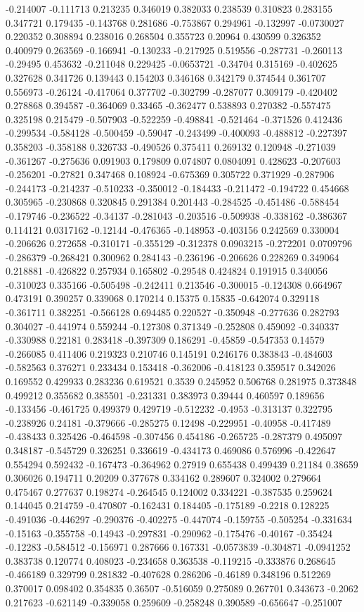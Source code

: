 -0.214007 -0.111713 0.213235 0.346019 0.382033 0.238539 0.310823 0.283155 0.347721 0.179435 -0.143768 0.281686 -0.753867 0.294961 -0.132997 -0.0730027 0.220352 0.308894 0.238016 0.268504 0.355723 0.20964 0.430599 0.326352 0.400979 0.263569 -0.166941 -0.130233 -0.217925 0.519556 -0.287731 -0.260113 -0.29495 0.453632 -0.211048 0.229425 -0.0653721 -0.34704 0.315169 -0.402625 0.327628 0.341726 0.139443 0.154203 0.346168 0.342179 0.374544 0.361707 0.556973 -0.26124 -0.417064 0.377702 -0.302799 -0.287077 0.309179 -0.420402 0.278868 0.394587 -0.364069 0.33465 -0.362477 0.538893 0.270382 -0.557475 0.325198 0.215479 -0.507903 -0.522259 -0.498841 -0.521464 -0.371526 0.412436 -0.299534 -0.584128 -0.500459 -0.59047 -0.243499 -0.400093 -0.488812 -0.227397 0.358203 -0.358188 0.326733 -0.490526 0.375411 0.269132 0.120948 -0.271039 -0.361267 -0.275636 0.091903 0.179809 0.074807 0.0804091 0.428623 -0.207603 -0.256201 -0.27821 0.347468 0.108924 -0.675369 0.305722 0.371929 -0.287906 -0.244173 -0.214237 -0.510233 -0.350012 -0.184433 -0.211472 -0.194722 0.454668 0.305965 -0.230868 0.320845 0.291384 0.201443 -0.284525 -0.451486 -0.588454 -0.179746 -0.236522 -0.34137 -0.281043 -0.203516 -0.509938 -0.338162 -0.386367 0.114121 0.0317162 -0.12144 -0.476365 -0.148953 -0.403156 0.242569 0.330004 -0.206626 0.272658 -0.310171 -0.355129 -0.312378 0.0903215 -0.272201 0.0709796 -0.286379 -0.268421 0.300962 0.284143 -0.236196 -0.206626 0.228269 0.349064 0.218881 -0.426822 0.257934 0.165802 -0.29548 0.424824 0.191915 0.340056 -0.310023 0.335166 -0.505498 -0.242411 0.213546 -0.300015 -0.124308 0.664967 0.473191 0.390257 0.339068 0.170214 0.15375 0.15835 -0.642074 0.329118 -0.361711 0.382251 -0.566128 0.694485 0.220527 -0.350948 -0.277636 0.282793 0.304027 -0.441974 0.559244 -0.127308 0.371349 -0.252808 0.459092 -0.340337 -0.330988 0.22181 0.283418 -0.397309 0.186291 -0.45859 -0.547353 0.14579 -0.266085 0.411406 0.219323 0.210746 0.145191 0.246176 0.383843 -0.484603 -0.582563 0.376271 0.233434 0.153418 -0.362006 -0.418123 0.359517 0.342026 0.169552 0.429933 0.283236 0.619521 0.3539 0.245952 0.506768 0.281975 0.373848 0.499212 0.355682 0.385501 -0.231331 0.383973 0.39444 0.460597 0.189656 -0.133456 -0.461725 0.499379 0.429719 -0.512232 -0.4953 -0.313137 0.322795 -0.238926 0.24181 -0.379666 -0.285275 0.12498 -0.229951 -0.40958 -0.417489 -0.438433 0.325426 -0.464598 -0.307456 0.454186 -0.265725 -0.287379 0.495097 0.348187 -0.545729 0.326251 0.336619 -0.434173 0.469086 0.576996 -0.422647 0.554294 0.592432 -0.167473 -0.364962 0.27919 0.655438 0.499439 0.21184 0.38659 0.306026 0.194711 0.20209 0.377678 0.334162 0.289607 0.324002 0.279664 0.475467 0.277637 0.198274 -0.264545 0.124002 0.334221 -0.387535 0.259624 0.144045 0.214759 -0.470807 -0.162431 0.184405 -0.175189 -0.2218 0.128225 -0.491036 -0.446297 -0.290376 -0.402275 -0.447074 -0.159755 -0.505254 -0.331634 -0.15163 -0.355758 -0.14943 -0.297831 -0.290962 -0.175476 -0.40167 -0.35424 -0.12283 -0.584512 -0.156971 0.287666 0.167331 -0.0573839 -0.304871 -0.0941252 0.383738 0.120774 0.408023 -0.234658 0.363538 -0.119215 -0.333876 0.268645 -0.466189 0.329799 0.281832 -0.407628 0.286206 -0.46189 0.348196 0.512269 0.370017 0.098402 0.354835 0.36507 -0.516059 0.275089 0.267701 0.343673 -0.2062 0.217623 -0.621149 -0.339058 0.259609 -0.258248 0.390589 -0.656647 -0.251007 